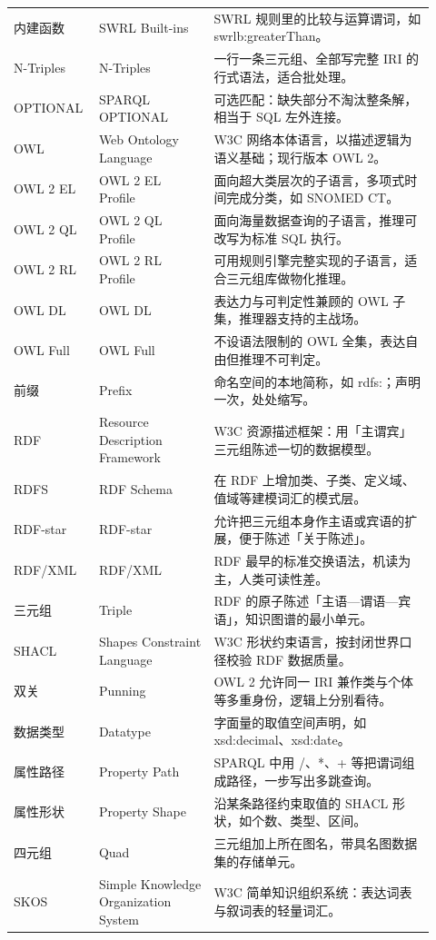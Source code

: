 \begin{longtable}{@{}p{0.16\linewidth}p{0.26\linewidth}p{0.5\linewidth}@{}}
内建函数 & SWRL Built-ins & SWRL 规则里的比较与运算谓词，如 swrlb:greaterThan。 \\
N-Triples & N-Triples & 一行一条三元组、全部写完整 IRI 的行式语法，适合批处理。 \\
OPTIONAL & SPARQL OPTIONAL & 可选匹配：缺失部分不淘汰整条解，相当于 SQL 左外连接。 \\
OWL & Web Ontology Language & W3C 网络本体语言，以描述逻辑为语义基础；现行版本 OWL 2。 \\
OWL 2 EL & OWL 2 EL Profile & 面向超大类层次的子语言，多项式时间完成分类，如 SNOMED CT。 \\
OWL 2 QL & OWL 2 QL Profile & 面向海量数据查询的子语言，推理可改写为标准 SQL 执行。 \\
OWL 2 RL & OWL 2 RL Profile & 可用规则引擎完整实现的子语言，适合三元组库做物化推理。 \\
OWL DL & OWL DL & 表达力与可判定性兼顾的 OWL 子集，推理器支持的主战场。 \\
OWL Full & OWL Full & 不设语法限制的 OWL 全集，表达自由但推理不可判定。 \\
前缀 & Prefix & 命名空间的本地简称，如 rdfs:；声明一次，处处缩写。 \\
RDF & Resource Description Framework & W3C 资源描述框架：用「主谓宾」三元组陈述一切的数据模型。 \\
RDFS & RDF Schema & 在 RDF 上增加类、子类、定义域、值域等建模词汇的模式层。 \\
RDF-star & RDF-star & 允许把三元组本身作主语或宾语的扩展，便于陈述「关于陈述」。 \\
RDF/XML & RDF/XML & RDF 最早的标准交换语法，机读为主，人类可读性差。 \\
三元组 & Triple & RDF 的原子陈述「主语—谓语—宾语」，知识图谱的最小单元。 \\
SHACL & Shapes Constraint Language & W3C 形状约束语言，按封闭世界口径校验 RDF 数据质量。 \\
双关 & Punning & OWL 2 允许同一 IRI 兼作类与个体等多重身份，逻辑上分别看待。 \\
数据类型 & Datatype & 字面量的取值空间声明，如 xsd:decimal、xsd:date。 \\
属性路径 & Property Path & SPARQL 中用 /、*、+ 等把谓词组成路径，一步写出多跳查询。 \\
属性形状 & Property Shape & 沿某条路径约束取值的 SHACL 形状，如个数、类型、区间。 \\
四元组 & Quad & 三元组加上所在图名，带具名图数据集的存储单元。 \\
SKOS & Simple Knowledge Organization System & W3C 简单知识组织系统：表达词表与叙词表的轻量词汇。 \\

\end{longtable}
